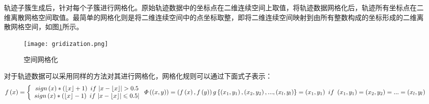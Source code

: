 轨迹子簇生成后，针对每个子簇进行网格化。原始轨迹数据中的坐标点在二维连续空间上取值，将轨迹数据网格化后，轨迹所有坐标点在二维离散网格空间取值。最简单的网格化则是将二维连续空间中的点坐标取整，即将二维连续空间映射到由所有整数构成的坐标形成的二维离散网格空间，如图\ref{gridization}所示。
\begin{figure}[h]
	\texttt{[image: gridization.png]}
	\caption{空间网格化}
	\label{gridization}
\end{figure}

对于轨迹数据可以采用同样的方法对其进行网格化，网格化规则可以通过下面式子表示：
\[
f\left( x \right) =\left\{ \begin{array}{c}
	sign\left( x \right) *\left( \lfloor x \rfloor +1 \right) \,\,if\,\,|x-\lfloor x \rfloor |>0.5\\
	sign\left( x \right) *\left( \lfloor x \rfloor -1 \right) \,\,if\,\,|x-\lfloor x \rfloor |\leqslant 0.5|\\
\end{array} \right. \\
\varPhi \left( \left( x,y \right) \right) =\left( f\left( x \right) ,f\left( y \right) \right) 
\\
g\left\{ \left( x_1,y_1 \right) ,\left( x_2,y_2 \right) ,...,\left( x_l,y_l \right) \right\} =\left( x_1,y_1 \right) \,\, if\,\,\left( x_1,y_1 \right) =\left( x_2,y_2 \right) =...=\left( x_l,y_l \right) 
\]

